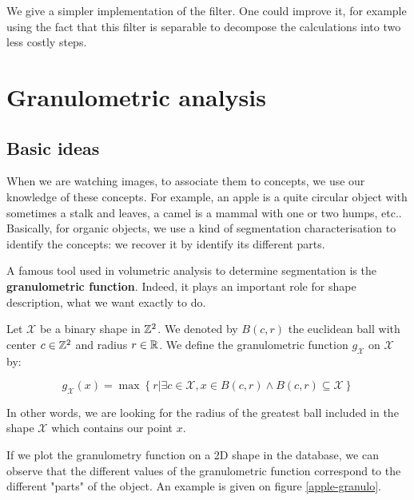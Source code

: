 We give a simpler implementation of the filter. One could improve it, for example using the fact that this filter is separable to decompose the calculations into two less costly steps.

\section{Granulometric analysis}

\subsection{Basic ideas}

When we are watching images, to associate them to concepts, we use our knowledge of these concepts. For example, an apple is a quite circular object with sometimes a stalk and leaves, a camel is a mammal with one or two humps, etc.. Basically, for organic objects, we use a kind of segmentation characterisation to identify the concepts: we recover it by identify its different parts.

A famous tool used in volumetric analysis to determine segmentation is the \textbf{granulometric function}. Indeed, it plays an important role for shape description, what we want exactly to do.

\begin{definition}
Let $\mathcal{X}$ be a binary shape in $\mathbb{Z}^{2}$. We denoted by $B(c,r)$ the euclidean ball with center $c \in \mathbb{Z}^{2}$ and radius $r \in \mathbb{R}$. We define the granulometric function $g_{\mathcal{X}}$ on $\mathcal{X}$ by:

$$ g_{\mathcal{X}}(x) = \operatorname{max} \left\{ r | \exists c \in \mathcal{X}, x \in B(c,r) \wedge B(c,r) \subseteq \mathcal{X} \right\} $$ 
\end{definition}

In other words, we are looking for the radius of the greatest ball included in the shape $\mathcal{X}$ which contains our point $x$.

If we plot the granulometry function on a 2D shape in the database, we can observe that the different values of the granulometric function correspond to the different "parts" of the object. An example is given on figure \ref{apple-granulo}.

